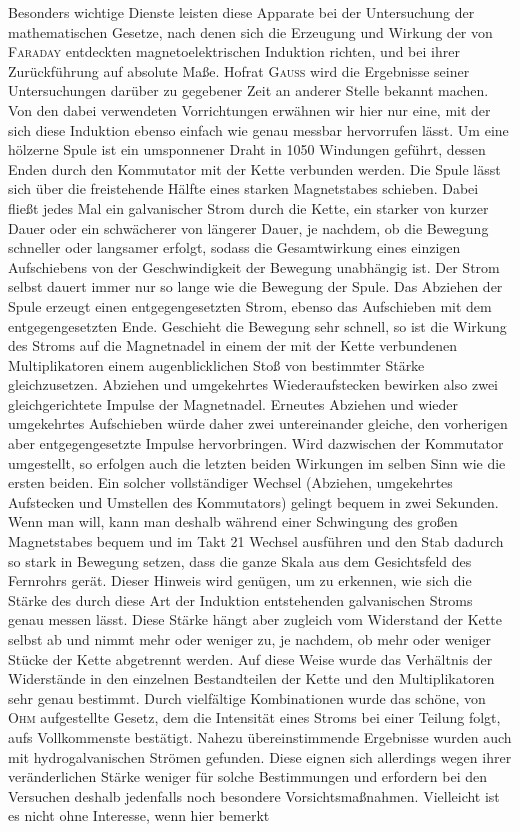 Besonders wichtige Dienste leisten diese Apparate bei der Untersuchung der mathematischen Gesetze, nach denen sich die Erzeugung und Wirkung der von \textsc{Faraday} entdeckten magnetoelektrischen Induktion richten, und bei ihrer Zurückführung auf absolute Maße. Hofrat \textsc{Gauss} wird die Ergebnisse seiner Untersuchungen darüber zu gegebener Zeit an anderer Stelle bekannt machen. Von den dabei verwendeten Vorrichtungen erwähnen wir hier nur eine, mit der sich diese Induktion ebenso einfach wie genau messbar hervorrufen lässt. Um eine hölzerne Spule ist ein umsponnener Draht in 1050 Windungen geführt, dessen Enden durch den Kommutator mit der Kette verbunden werden. Die Spule lässt sich über die freistehende Hälfte eines starken Magnetstabes schieben. Dabei fließt jedes Mal ein galvanischer Strom durch die Kette, ein starker von kurzer Dauer oder ein schwächerer von längerer Dauer, je nachdem, ob die Bewegung schneller oder langsamer erfolgt, sodass die Gesamtwirkung eines einzigen Aufschiebens von der Geschwindigkeit der Bewegung unabhängig ist. Der Strom selbst dauert immer nur so lange wie die Bewegung der Spule. Das Abziehen der Spule erzeugt einen entgegengesetzten Strom, ebenso das Aufschieben mit dem entgegengesetzten Ende. Geschieht die Bewegung sehr schnell, so ist die Wirkung des Stroms auf die Magnetnadel in einem der mit der Kette verbundenen Multiplikatoren einem augenblicklichen Stoß von bestimmter Stärke gleichzusetzen. Abziehen und umgekehrtes Wiederaufstecken bewirken also zwei gleichgerichtete Impulse der Magnetnadel. Erneutes Abziehen und wieder umgekehrtes Aufschieben würde daher zwei untereinander gleiche, den vorherigen aber entgegengesetzte Impulse hervorbringen. Wird dazwischen der Kommutator umgestellt, so erfolgen auch die letzten beiden Wirkungen im selben Sinn wie die ersten beiden. Ein solcher vollständiger Wechsel (Abziehen, umgekehrtes Aufstecken und Umstellen des Kommutators) gelingt bequem in zwei Sekunden. Wenn man will, kann man deshalb während einer Schwingung des großen Magnetstabes bequem und im Takt 21 Wechsel ausführen und den Stab dadurch so stark in Bewegung setzen, dass die ganze Skala aus dem Gesichtsfeld des Fernrohrs gerät. Dieser Hinweis wird genügen, um zu erkennen, wie sich die Stärke des durch diese Art der Induktion entstehenden galvanischen Stroms genau messen lässt. Diese Stärke hängt aber zugleich vom Widerstand der Kette selbst ab und nimmt mehr oder weniger zu, je nachdem, ob mehr oder weniger Stücke der Kette abgetrennt werden. Auf diese Weise wurde das Verhältnis der Widerstände in den einzelnen Bestandteilen der Kette und den Multiplikatoren sehr genau bestimmt. Durch vielfältige Kombinationen wurde das schöne, von \textsc{Ohm} aufgestellte Gesetz, dem die Intensität eines Stroms bei einer Teilung folgt, aufs Vollkommenste bestätigt. Nahezu übereinstimmende Ergebnisse wurden auch mit hydrogalvanischen Strömen gefunden. Diese eignen sich allerdings wegen ihrer veränderlichen Stärke weniger für solche Bestimmungen und erfordern bei den Versuchen deshalb jedenfalls noch besondere Vorsichtsmaßnahmen. Vielleicht ist es nicht ohne Interesse, wenn hier bemerkt
